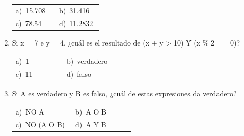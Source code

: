 \documentclass[11pt,a4paper]{article}
\begin{document}
\begin{enumerate}[label=\textbf{\arabic*.},leftmargin=*,itemsep=11pt,topsep=0pt]
\begin{minipage}[t]{\linewidth}
\vspace{4pt}
\begin{tabular}{@{}p{0.47\linewidth}p{0.47\linewidth}@{}}
a)~15.708 & b)~31.416 \\
c)~78.54 & d)~11.2832 \\
\end{tabular}
\end{minipage}

\item \begin{minipage}[t]{\linewidth}
Si x = 7 e y = 4, ¿cuál es el resultado de (x + y > 10) Y (x \% 2 == 0)?

\vspace{4pt}
\begin{tabular}{@{}p{0.47\linewidth}p{0.47\linewidth}@{}}
a)~1 & b)~verdadero \\
c)~11 & d)~falso \\
\end{tabular}
\end{minipage}

\item \begin{minipage}[t]{\linewidth}
Si A es verdadero y B es falso, ¿cuál de estas expresiones da verdadero?

\vspace{4pt}
\begin{tabular}{@{}p{0.47\linewidth}p{0.47\linewidth}@{}}
a)~NO A & b)~A O B \\
c)~NO (A O B) & d)~A Y B \\
\end{tabular}
\end{minipage}

\end{enumerate}
\end{document}
